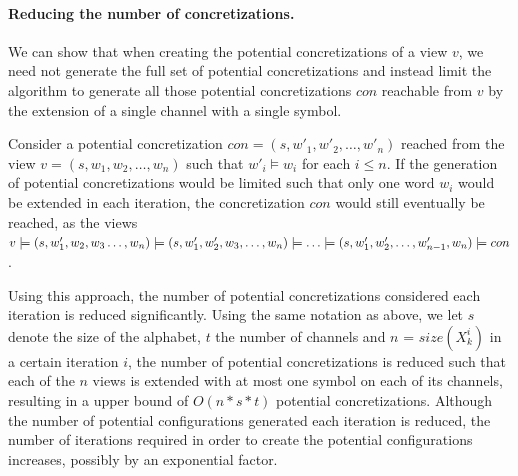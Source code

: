 \paragraph{Reducing the number of concretizations.}
We can show that when creating the potential concretizations of a view $v$, we need not generate the full set of potential concretizations and instead limit the algorithm to generate all those potential concretizations $con$ reachable from $v$ by the extension of a single channel with a single symbol.

Consider a potential concretization $con = (s, w'_1, w'_2, \ldots, w'_n)$ reached from the view $v = (s, w_1, w_2, \ldots, w_n)$ such that $w'_i \models w_i$ for each $i \leq n$. If the generation of potential concretizations would be limited such that only one word $w_i$ would be extended in each iteration, the concretization $con$ would still eventually be reached, as the views $v \models (s, w'_1, w_2, w_3 \ldots, w_n) \models (s, w'_1, w'_2, w_3, \ldots, w_n) \models \ldots \models (s, w'_1, w'_2, \ldots, w'_{n-1}, w_n) \models con$.

Using this approach, the number of potential concretizations considered each iteration is reduced significantly. Using the same notation as above, we let $s$ denote the size of the alphabet, $t$ the number of channels and $n$ = $size(X_k^i)$ in a certain iteration $i$, the number of potential concretizations is reduced such that each of the $n$ views is extended with at most one symbol on each of its channels, resulting in a upper bound of $O(n*s*t)$ potential concretizations. Although the number of potential configurations generated each iteration is reduced, the number of iterations required in order to create the potential configurations increases, possibly by an exponential factor.

